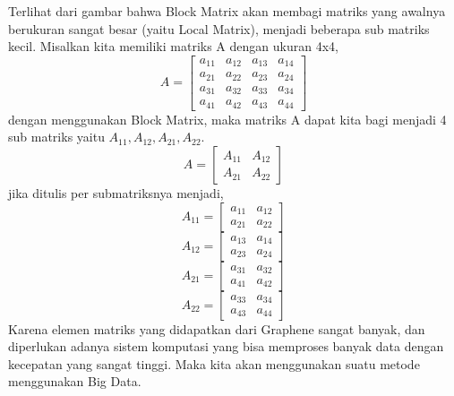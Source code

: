\documentclass[12pt,a4paper]{report}
\begin{document}
	Terlihat dari gambar bahwa Block Matrix akan membagi matriks yang awalnya berukuran sangat besar (yaitu Local Matrix), menjadi beberapa sub matriks kecil. Misalkan kita memiliki matriks A dengan ukuran 4x4,
	\begin{equation}
	A = 
	\begin{bmatrix}
	a_{11} & a_{12} & a_{13} & a_{14} \\
	a_{21} & a_{22} & a_{23} & a_{24} \\
	a_{31} & a_{32} & a_{33} & a_{34} \\
	a_{41} & a_{42} & a_{43} & a_{44}
	\end{bmatrix}
	\end{equation}
	dengan menggunakan Block Matrix, maka matriks A dapat kita bagi menjadi 4 sub matriks yaitu {$A_{11}, A_{12}, A_{21}, A_{22}$}.
	\begin{equation}
	A = 
	\begin{bmatrix}
	A_{11} & A_{12} \\
	A_{21} & A_{22}
	\end{bmatrix}
	\end{equation}
	jika ditulis per submatriksnya menjadi,
	\begin{equation}
	A_{11} = 
	\begin{bmatrix}
	a_{11} & a_{12} \\
	a_{21} & a_{22}
	\end{bmatrix}
	\end{equation}
	\begin{equation}
	A_{12} = 
	\begin{bmatrix}
	a_{13} & a_{14} \\
	a_{23} & a_{24}
	\end{bmatrix}
	\end{equation}
	\begin{equation}
	A_{21} = 
	\begin{bmatrix}
	a_{31} & a_{32} \\
	a_{41} & a_{42}
	\end{bmatrix}
	\end{equation}
	\begin{equation}
	A_{22} = 
	\begin{bmatrix}
	a_{33} & a_{34} \\
	a_{43} & a_{44}
	\end{bmatrix}
	\end{equation}
	Karena elemen matriks yang didapatkan dari Graphene sangat banyak, dan diperlukan adanya sistem komputasi yang bisa memproses banyak data dengan kecepatan yang sangat tinggi. Maka kita akan menggunakan suatu metode menggunakan Big Data.
	
\end{document}
